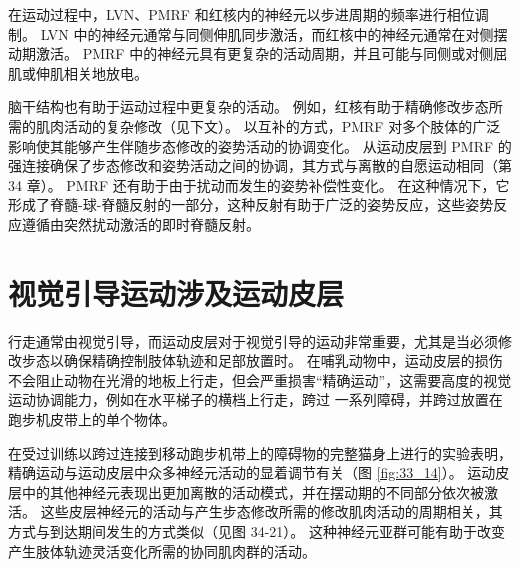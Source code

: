 在运动过程中，LVN、PMRF 和红核内的神经元以步进周期的频率进行相位调制。 LVN 中的神经元通常与同侧伸肌同步激活，而红核中的神经元通常在对侧摆动期激活。 PMRF 中的神经元具有更复杂的活动周期，并且可能与同侧或对侧屈肌或伸肌相关地放电。

脑干结构也有助于运动过程中更复杂的活动。 例如，红核有助于精确修改步态所需的肌肉活动的复杂修改（见下文）。 以互补的方式，PMRF 对多个肢体的广泛影响使其能够产生伴随步态修改的姿势活动的协调变化。 从运动皮层到 PMRF 的强连接确保了步态修改和姿势活动之间的协调，其方式与离散的自愿运动相同（第 34 章）。 PMRF 还有助于由于扰动而发生的姿势补偿性变化。 在这种情况下，它形成了脊髓-球-脊髓反射的一部分，这种反射有助于广泛的姿势反应，这些姿势反应遵循由突然扰动激活的即时脊髓反射。


\section{视觉引导运动涉及运动皮层}

行走通常由视觉引导，而运动皮层对于视觉引导的运动非常重要，尤其是当必须修改步态以确保精确控制肢体轨迹和足部放置时。 在哺乳动物中，运动皮层的损伤不会阻止动物在光滑的地板上行走，但会严重损害“精确运动”，这需要高度的视觉运动协调能力，例如在水平梯子的横档上行走，跨过 一系列障碍，并跨过放置在跑步机皮带上的单个物体。

在受过训练以跨过连接到移动跑步机带上的障碍物的完整猫身上进行的实验表明，精确运动与运动皮层中众多神经元活动的显着调节有关（图 \ref{fig:33_14}）。
运动皮层中的其他神经元表现出更加离散的活动模式，并在摆动期的不同部分依次被激活。 这些皮层神经元的活动与产生步态修改所需的修改肌肉活动的周期相关，其方式与到达期间发生的方式类似（见图 34-21）。 这种神经元亚群可能有助于改变产生肢体轨迹灵活变化所需的协同肌肉群的活动。

